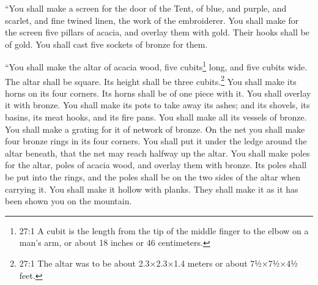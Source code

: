 \myverse{}“You shall make a screen for the door of the Tent, of blue,
and purple, and scarlet, and fine twined linen, the work of the embroiderer.
\myverse{}You shall make for the screen five pillars of acacia, and overlay them with
gold. Their hooks shall be of gold. You shall cast five sockets of bronze for them.



\mychapter{} \myverse*{}“You shall make the altar of acacia wood, five cubits\footnote{27:1 A cubit is the length from the tip of the middle finger to the elbow on a man’s arm, or about
	18 inches or 46 centimeters.} long, and five cubits wide. The altar shall be square. Its height
shall be three cubits.\footnote{27:1 The altar was to be about 2.3×2.3×1.4 meters or about 7½×7½×4½ feet.}
\myverse{}You shall make its horns on its four corners. Its horns shall be of one piece
with it. You shall overlay it with bronze.
\myverse{}You shall make its pots to take away its ashes; and its shovels, its basins,
its meat hooks, and its fire pans. You shall make all its vessels of bronze.
\myverse{}You shall make a grating for it of network of bronze. On the net you shall
make four bronze rings in its four corners.
\myverse{}You shall put it under the ledge around the altar beneath, that the net may
reach halfway up the altar.
\myverse{}You shall make poles for the altar, poles of acacia wood, and overlay them
with bronze.
\myverse{}Its poles shall be put into the rings, and the poles shall be on the two sides
of the altar when carrying it.
\myverse{}You shall make it hollow with planks. They shall make it as it has been shown
you on the mountain.



